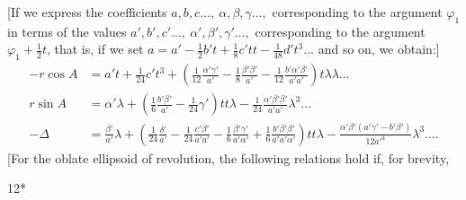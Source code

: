 [If we express the coefficients \(a,b,c\ldots,\ \alpha,\beta,\gamma\ldots,\) corresponding to the argument
\(\varphi_1\) in terms of the values \(a',b',c'\ldots,\ \alpha',\beta',\gamma'\ldots,\) corresponding to the
argument \(\varphi_1+\tfrac12t\), that is, if we set
\(a=a'-\tfrac12b't+\tfrac18c'tt-\tfrac1{48}d't^3\ldots\)
and so on, we obtain:]
\[
\begin{aligned}
-r\cos A&=a't+\tfrac1{24}c't^3+
\left(\tfrac1{12}\frac{\alpha'\gamma'}{a'}-\tfrac18\frac{\beta'\beta'}{a'}-\tfrac1{12}\frac{b'\alpha'\beta'}{a'a'}\right)t\lambda\lambda\ldots\\[1ex]
r\sin A&=\alpha'\lambda+
\left(\tfrac16\frac{b'\beta'}{a'}-\tfrac1{24}\gamma'\right)tt\lambda
-\tfrac1{24}\frac{\alpha'\beta'\beta'}{a'a'}\lambda^3\ldots\\[1ex]
-\Delta&=\frac{\beta'}{a'}\lambda+
\left(\tfrac1{24}\frac{\delta'}{a'}-\tfrac1{24}\frac{c'\beta'}{a'a'}-\tfrac16\frac{\beta'\gamma'}{a'\alpha'}
+\tfrac16\frac{b'\beta'\beta'}{a'a'\alpha'}\right)tt\lambda
-\frac{\alpha'\beta'(a'\gamma'-b'\beta')}{12{a'}^4}\lambda^3\ldots.
\end{aligned}
\]
[For the oblate ellipsoid of revolution, the following relations hold if, for brevity,
\par\vfill\hfill12*\par
\endgroup
\endgroup
